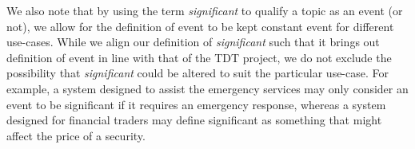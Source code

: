 We also note that by using the term \emph{significant} to qualify a topic as an event (or not), we allow for the definition of event to be kept constant event for different use-cases.
While we align our definition of \emph{significant} such that it brings out definition of event in line with that of the TDT project, we do not exclude the possibility that \emph{significant} could be altered to suit the particular use-case.
For example, a system designed to assist the emergency services may only consider an event to be significant if it requires an emergency response, whereas a system designed for financial traders may define significant as something that might affect the price of a security.